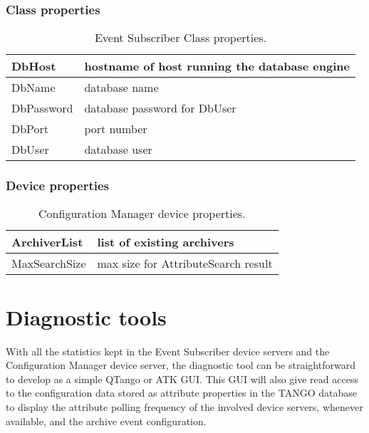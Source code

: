 \documentclass[11pt,a4paper]{article}
\def \es{Event Subscriber}
\def \cm{Configuration Manager}
\def \tango{TANGO}
\begin{document}
\subsubsection{Class properties}
\label{cm:classprop}
\begin{table}[H]
	\begin{tabular}{p{}|p{}}
		\hline
		DbHost & hostname of host running the database engine \\
		\hline
		DbName & database name \\
		\hline
		DbPassword & database password for DbUser \\
		\hline
		DbPort & port number \\
		\hline
		DbUser & database user \\
		\hline
	\end{tabular}
	\caption{\es{} Class properties.}
	\label{cm:classprop-table}
\end{table}
\subsubsection{Device properties}
\label{cm:devprop}
\begin{table}[H]
	\begin{tabular}{p{}|p{}}
		\hline
		ArchiverList & list of existing archivers \\
		\hline
		MaxSearchSize & max size for AttributeSearch result \\
		\hline
	\end{tabular}
	\caption{\cm{} device properties.}
	\label{cm:devprop-table}
\end{table}

\newpage{\clearpage}

\section{Diagnostic tools}
With all the statistics kept in the \es{} device servers and the
\cm{} device server, the diagnostic tool can be straightforward
to develop as a simple QTango or ATK GUI.
This GUI will also give read access to the configuration data stored
as attribute properties in the \tango{} database to display the
attribute polling frequency of the involved device servers, whenever
available, and the archive event configuration.

\newpage{\clearpage}
\end{document}
